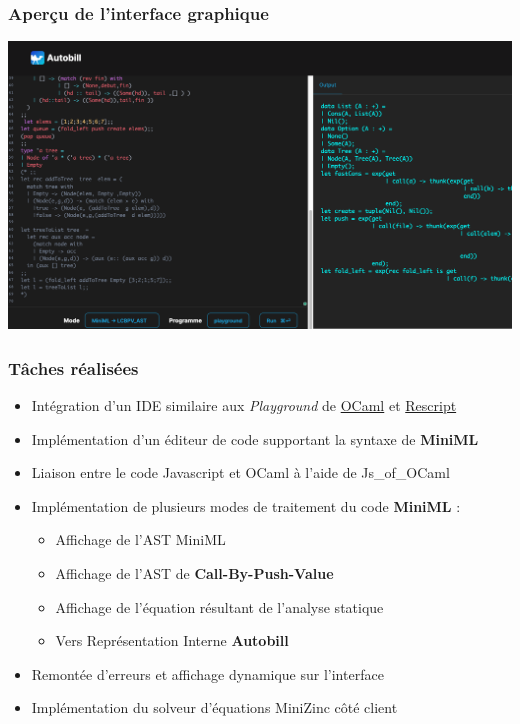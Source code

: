 \documentclass[
  12pt,
]{article}
\providecommand{\tightlist}{%
  \setlength{\itemsep}{0pt}\setlength{\parskip}{0pt}}
\begin{document}
\hypertarget{aperuxe7u-de-linterface-graphique}{%
\subsubsection{Aperçu de l'interface
graphique}\label{aperuxe7u-de-linterface-graphique}}

\includegraphics{./MarkdownVersions/Rapport/screen.png}

\hypertarget{tuxe2ches-ruxe9alisuxe9es}{%
\subsubsection{Tâches réalisées}\label{tuxe2ches-ruxe9alisuxe9es}}

\begin{itemize}
\tightlist
\item
  Intégration d'un IDE similaire aux \emph{Playground} de
  \href{https://OCaml.org/play}{OCaml} et
  \href{https://rescript-lang.org/try}{Rescript}
\item
  Implémentation d'un éditeur de code supportant la syntaxe de
  \textbf{MiniML}
\item
  Liaison entre le code Javascript et OCaml à l'aide de Js\_of\_OCaml
\item
  Implémentation de plusieurs modes de traitement du code
  \textbf{MiniML} :

  \begin{itemize}
  \tightlist
  \item
    Affichage de l'AST MiniML
  \item
    Affichage de l'AST de \textbf{Call-By-Push-Value}
  \item
    Affichage de l'équation résultant de l'analyse statique
  \item
    Vers Représentation Interne \textbf{Autobill}
  \end{itemize}
\item
  Remontée d'erreurs et affichage dynamique sur l'interface
\item
  Implémentation du solveur d'équations MiniZinc côté client
\end{itemize}
\end{document}
